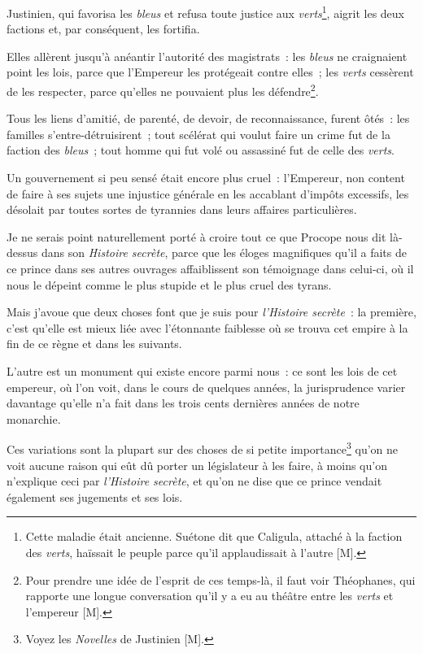 \documentclass[french,twoside]{book} %
\begin{document}
Justinien, qui favorisa les {\itshape bleus} et refusa toute justice aux {\itshape verts}\footnote{Cette maladie était ancienne. Suétone dit que Caligula, attaché à la faction des {\itshape verts}, haïssait le peuple parce qu’il applaudissait à l’autre [M].}, aigrit les deux factions et, par conséquent, les fortifia.\par
Elles allèrent jusqu’à anéantir l’autorité des magistrats : les {\itshape bleus} ne craignaient point les lois, parce que l’Empereur les protégeait contre elles ; les {\itshape verts} cessèrent de les respecter, parce qu’elles ne pouvaient plus les défendre\footnote{Pour prendre une idée de l’esprit de ces temps-là, il faut voir Théophanes, qui rapporte une longue conversation qu’il y a eu au théâtre entre les {\itshape verts} et l’empereur [M].}.\par
Tous les liens d’amitié, de parenté, de devoir, de reconnaissance, furent ôtés : les familles s’entre-détruisirent ; tout scélérat qui voulut faire un crime fut de la faction des {\itshape bleus} ; tout homme qui fut volé ou assassiné fut de celle des {\itshape verts}.\par
Un gouvernement si peu sensé était encore plus cruel : l’Empereur, non content de faire à ses sujets une injustice générale en les accablant d’impôts excessifs, les désolait par toutes sortes de tyrannies dans leurs affaires particulières.\par
Je ne serais point naturellement porté à croire tout ce que Procope nous dit là-dessus dans son {\itshape Histoire secrète}, parce que les éloges magnifiques qu’il a faits de ce prince dans ses autres ouvrages affaiblissent son témoignage dans celui-ci, où il nous le dépeint comme le plus stupide et le plus cruel des tyrans.\par
Mais j’avoue que deux choses font que je suis pour {\itshape l’Histoire secrète} : la première, c’est qu’elle est mieux liée avec l’étonnante faiblesse où se trouva cet empire à la fin de ce règne et dans les suivants.\par
L’autre est un monument qui existe encore parmi nous : ce sont les lois de cet empereur, où l’on voit, dans le cours de quelques années, la jurisprudence varier davantage qu’elle n’a fait dans les trois cents dernières années de notre monarchie.\par
Ces variations sont la plupart sur des choses de si petite importance\footnote{Voyez les {\itshape Novelles} de Justinien [M].} qu’on ne voit aucune raison qui eût dû porter un législateur à les faire, à moins qu’on n’explique ceci par {\itshape l’Histoire secrète}, et qu’on ne dise que ce prince vendait également ses jugements et ses lois.\par
\end{document}
